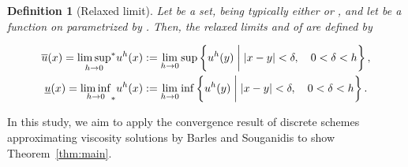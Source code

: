 \documentclass[11pt]{article}
\makeatletter
\numberwithin{equation}{section}
\newtheorem{defn}[theorem]{Definition}
\newcommand{\closure}[1]{\overline{#1}}
\newcounter{mathrecordid}
\newcommand{\mathboxbegin}[1]{%
  \stepcounter{mathrecordid}%
  \immediate\write\mathrecords{\themathrecordid,#1}%
  \special{pdf:bann << /Type /Annot /Subtype /Link /Border [0 0 0]
    /MathBoxID \themathrecordid /F 2
    /A << /S /URI /URI (urn:mathbox:\themathrecordid) >> >>}}
\newcommand{\mathboxinlineplain}[1]{$#1$}
\newcommand{\mathboxinline}[1]{%
  $\mathboxbegin{inline}#1\special{pdf:eann}$}
\newcommand{\recordmath}{%
  \ifmeasuring@\expandafter\mathboxinlineplain
  \else\expandafter\mathboxinline\fi}
\makeatother
\begin{document}
\begin{defn}[Relaxed limit]
    \label{defn:relax-limit}
    Let \recordmath{\mathcal O} be a set, being typically either \recordmath{\closure{\Omega}} or \recordmath{\closure{\Omega}\times[0,T]},
    and let \recordmath{u^h} be a function on \recordmath{\mathcal O} parametrized by \recordmath{h>0}.
    Then, the relaxed limits \recordmath{\overline u} and \recordmath{\underline{u}} of \recordmath{u^h} are defined by

    \begin{equation*}
        \begin{aligned}
        \overline{u}(x) = {{\limsup_{h\to 0}}^*}u^h(x) &:= \lim_{h\to 0}\sup\left\{u^h(y)\biggm| |x-y| < \delta,\quad 0<\delta<h\right\},\\
        \underline{u}(x) = {{\liminf_{h\to 0}}_*}u^h(x) &:= \lim_{h\to 0}\inf\left\{u^h(y)\biggm| |x-y| < \delta,\quad 0<\delta<h\right\}.
        \end{aligned}
    \end{equation*}
\end{defn}

In this study, we aim to apply the convergence result of discrete schemes approximating viscosity solutions by Barles and Souganidis \cite[Theorem 2.1]{BS91} to show Theorem~\ref{thm:main}. 
\end{document}
